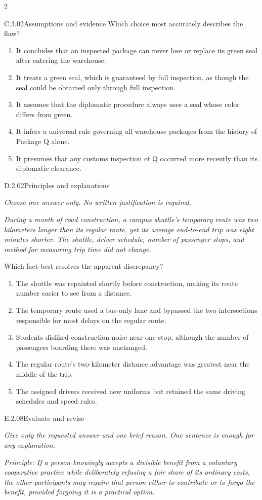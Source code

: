 \documentclass[9pt]{extarticle}
\newcommand{\choice}[1]{\item #1}
\begin{document}
\begin{multicols}{2}
\begin{DenseCoreProblem}{C.3.02}{Assumptions and evidence}
Which choice most accurately describes the flaw?
\begin{enumerate}[label=(\alph*)]
  \choice{It concludes that an inspected package can never lose or replace its green seal after entering the warehouse.}
  \choice{It treats a green seal, which is guaranteed by full inspection, as though the seal could be obtained only through full inspection.}
  \choice{It assumes that the diplomatic procedure always uses a seal whose color differs from green.}
  \choice{It infers a universal rule governing all warehouse packages from the history of Package Q alone.}
  \choice{It presumes that any customs inspection of Q occurred more recently than its diplomatic clearance.}
\end{enumerate}
\end{DenseCoreProblem}
\begin{DenseCoreProblem}{D.2.02}{Principles and explanations}
{\scriptsize\textit{Choose one answer only. No written justification is required.}\par}
\emph{During a month of road construction, a campus shuttle's temporary route was two kilometers longer than its regular route, yet its average end-to-end trip was eight minutes shorter. The shuttle, driver schedule, number of passenger stops, and method for measuring trip time did not change.}

Which fact best resolves the apparent discrepancy?
\begin{enumerate}[label=(\alph*)]
  \choice{The shuttle was repainted shortly before construction, making its route number easier to see from a distance.}
  \choice{The temporary route used a bus-only lane and bypassed the two intersections responsible for most delays on the regular route.}
  \choice{Students disliked construction noise near one stop, although the number of passengers boarding there was unchanged.}
  \choice{The regular route's two-kilometer distance advantage was greatest near the middle of the trip.}
  \choice{The assigned drivers received new uniforms but retained the same driving schedules and speed rules.}
\end{enumerate}
\end{DenseCoreProblem}
\begin{DenseCoreProblem}{E.2.08}{Evaluate and revise}
{\scriptsize\textit{Give only the requested answer and one brief reason. One sentence is enough for any explanation.}\par}
\emph{Principle: If a person knowingly accepts a divisible benefit from a voluntary cooperative practice while deliberately refusing a fair share of its ordinary costs, the other participants may require that person either to contribute or to forgo the benefit, provided forgoing it is a practical option.}


\end{DenseCoreProblem}
\end{multicols}
\end{document}
